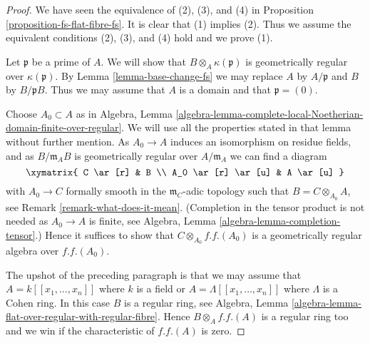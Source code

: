 \begin{proof}
We have seen the equivalence of (2), (3), and (4) in
Proposition \ref{proposition-fs-flat-fibre-fs}.
It is clear that (1) implies (2).
Thus we assume the equivalent conditions (2), (3), and (4) hold
and we prove (1).

\medskip\noindent
Let $\mathfrak p$ be a prime of $A$. We will show that
$B \otimes_A \kappa(\mathfrak p)$ is geometrically regular
over $\kappa(\mathfrak p)$.
By Lemma \ref{lemma-base-change-fs}
we may replace $A$ by $A/\mathfrak p$ and $B$ by $B/\mathfrak pB$.
Thus we may assume that $A$ is a domain and that $\mathfrak p = (0)$.

\medskip\noindent
Choose $A_0 \subset A$ as in Algebra, Lemma
\ref{algebra-lemma-complete-local-Noetherian-domain-finite-over-regular}.
We will use all the properties stated in that lemma without further mention.
As $A_0 \to A$ induces an isomorphism on residue fields, and as
$B/\mathfrak m_A B$ is geometrically regular over $A/\mathfrak m_A$
we can find a diagram
$$
\xymatrix{
C \ar[r] & B \\
A_0 \ar[r] \ar[u] & A \ar[u]
}
$$
with $A_0 \to C$ formally smooth in the $\mathfrak m_C$-adic topology
such that $B = C \otimes_{A_0} A$, see Remark \ref{remark-what-does-it-mean}.
(Completion in the tensor product is not needed as $A_0 \to A$ is
finite, see Algebra, Lemma \ref{algebra-lemma-completion-tensor}.)
Hence it suffices to show that $C \otimes_{A_0} f.f.(A_0)$
is a geometrically regular algebra over $f.f.(A_0)$.

\medskip\noindent
The upshot of the preceding paragraph is that we may assume that
$A = k[[x_1, \ldots, x_n]]$ where $k$ is a field or
$A = \Lambda[[x_1, \ldots, x_n]]$ where $\Lambda$ is a Cohen ring.
In this case $B$ is a regular ring, see
Algebra, Lemma \ref{algebra-lemma-flat-over-regular-with-regular-fibre}.
Hence $B \otimes_A f.f.(A)$ is a regular ring too and we win
if the characteristic of $f.f.(A)$ is zero.


\end{proof}
